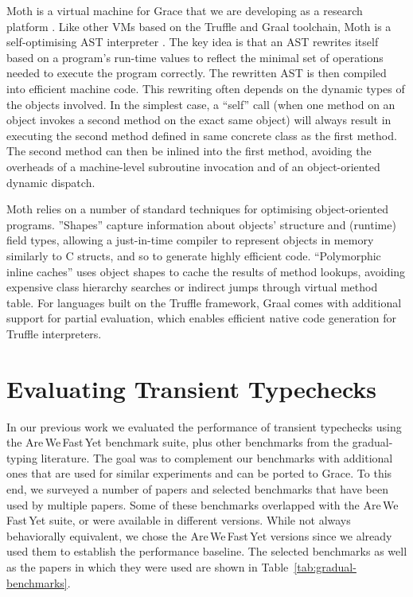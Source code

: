 \documentclass[sigplan,10pt,review,screen]{acmart}\settopmatter{printfolios=true}
\def\AWFY{Are\,We\,Fast\,Yet\xspace}
\begin{document}
Moth is a virtual machine for Grace that we are developing as a
research platform \cite{roberts-and-co-ecoop-2019}. Like other VMs
based on the Truffle and Graal toolchain, Moth is a self-optimising
AST interpreter \cite{Wurthinger:2012:SelfOptAST}. 
The key idea is that an AST rewrites itself based on a program's run-time values
to reflect the minimal set of operations needed to execute the program
correctly. The rewritten AST is then compiled into efficient machine
code. This rewriting often depends on the dynamic types of the
objects involved. In the simplest case, a ``self'' call (when one method
on an object invokes a second method on the exact same object) will
always result in executing the second method defined in same concrete
class as the first method. The second method can then be inlined into
the first method, avoiding the overheads of a machine-level subroutine
invocation and of an object-oriented dynamic dispatch.


Moth relies on a number of standard techniques for optimising
object-oriented programs.
''Shapes'' \citep{woss2014object} capture information about objects'
structure and (runtime) 
field types, allowing a just-in-time compiler to
represent objects in memory similarly to C structs, and so to 
generate highly efficient code.
``Polymorphic inline caches''
\citep{Hoelzle:91:PIC} uses object shapes to cache the results of
method lookups, avoiding expensive class hierarchy searches or
indirect jumps through virtual method table. 
For languages built on the Truffle framework,
Graal comes with  additional support for partial evaluation,
which enables efficient native code generation for
Truffle interpreters\citep{Wurthinger:2017:PPE}.



\section{Evaluating Transient Typechecks}
\label{s-eval}

In our previous work \cite{roberts-and-co-ecoop-2019} we evaluated the
performance of transient typechecks using the \AWFY
benchmark suite, plus other
benchmarks from the gradual-typing literature.
The goal was to complement our benchmarks with additional ones that are
used for similar experiments and can be ported to Grace.
To this end, we surveyed a number of papers\citep{Takikawa2016,Vitousek2017,Muehlboeck2017,Bauman2017,Richards2017,Stulova2016,Greenman2018}
and selected benchmarks that have been used by multiple papers.
Some of these benchmarks overlapped with the \AWFY suite,
or were available in different versions.
While not always behaviorally equivalent,
we chose the \AWFY versions since we already used them to
establish the performance baseline.
The selected benchmarks as well as the papers in which they were used are shown in
Table~\ref{tab:gradual-benchmarks}.
\end{document}
